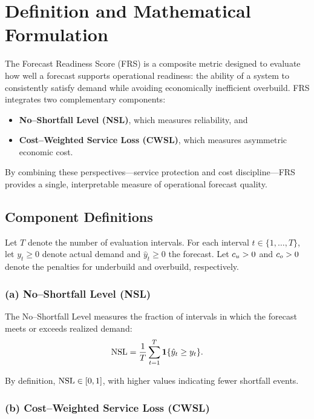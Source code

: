 \section{Definition and Mathematical Formulation}

The Forecast Readiness Score (FRS) is a composite metric designed to evaluate how
well a forecast supports operational readiness: the ability of a system to
consistently satisfy demand while avoiding economically inefficient overbuild.
FRS integrates two complementary components:

\begin{itemize}
    \item \textbf{No--Shortfall Level (NSL)}, which measures reliability, and
    \item \textbf{Cost--Weighted Service Loss (CWSL)}, which measures asymmetric
          economic cost.
\end{itemize}

By combining these perspectives—service protection and cost discipline—FRS
provides a single, interpretable measure of operational forecast quality.

\subsection{Component Definitions}

Let \(T\) denote the number of evaluation intervals. For each interval
\(t \in \{1,\dots,T\}\), let \(y_t \ge 0\) denote actual demand and
\(\hat{y}_t \ge 0\) the forecast. Let \(c_u > 0\) and \(c_o > 0\) denote the
penalties for underbuild and overbuild, respectively.

\subsubsection*{(a) No--Shortfall Level (NSL)}

The No--Shortfall Level measures the fraction of intervals in which the forecast
meets or exceeds realized demand:
\[
\text{NSL} = \frac{1}{T} \sum_{t=1}^T \mathbf{1}\{\hat{y}_t \ge y_t\}.
\]

By definition, \(\text{NSL} \in [0,1]\), with higher values indicating fewer shortfall
events.

\subsubsection*{(b) Cost--Weighted Service Loss (CWSL)}

